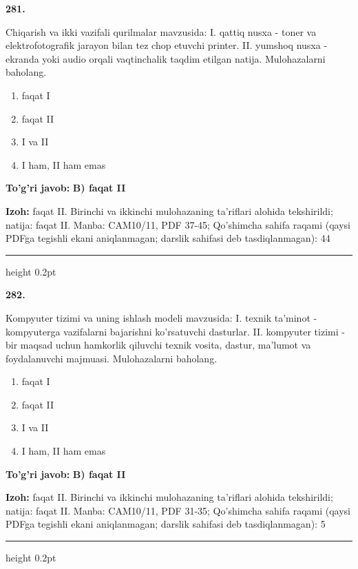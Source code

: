 \documentclass[10pt,a4paper]{article}
\begin{document}
{\bfseries\sffamily\color{ink} 281.}
\par
Chiqarish va ikki vazifali qurilmalar mavzusida: I. qattiq nusxa - toner va elektrofotografik jarayon bilan tez chop etuvchi printer. II. yumshoq nusxa - ekranda yoki audio orqali vaqtinchalik taqdim etilgan natija. Mulohazalarni baholang.
\begin{enumerate}[label=\Alph*),leftmargin=9mm]
\item faqat I
\item faqat II
\item I va II
\item I ham, II ham emas
\end{enumerate}
\begin{tcolorbox}[enhanced,breakable,colback=teal!4,colframe=teal!60!black,boxrule=0.45pt,arc=1.2mm,left=2.7mm,right=2.7mm,top=1.8mm,bottom=1.8mm,before skip=2mm,after skip=2mm]
{\bfseries\sffamily\color{teal}To'g'ri javob:} \textbf{B) faqat II}
\par\smallskip
{\bfseries Izoh:} faqat II. Birinchi va ikkinchi mulohazaning ta'riflari alohida tekshirildi; natija: faqat II. Manba: CAM10/11, PDF 37-45; Qo'shimcha sahifa raqami (qaysi PDFga tegishli ekani aniqlanmagan; darslik sahifasi deb tasdiqlanmagan): 44
\end{tcolorbox}
\vspace{2mm}\hrule height 0.2pt\vspace{3mm}

{\bfseries\sffamily\color{ink} 282.}
\par
Kompyuter tizimi va uning ishlash modeli mavzusida: I. texnik ta'minot - kompyuterga vazifalarni bajarishni ko'rsatuvchi dasturlar. II. kompyuter tizimi - bir maqsad uchun hamkorlik qiluvchi texnik vosita, dastur, ma'lumot va foydalanuvchi majmuasi. Mulohazalarni baholang.
\begin{enumerate}[label=\Alph*),leftmargin=9mm]
\item faqat I
\item faqat II
\item I va II
\item I ham, II ham emas
\end{enumerate}
\begin{tcolorbox}[enhanced,breakable,colback=teal!4,colframe=teal!60!black,boxrule=0.45pt,arc=1.2mm,left=2.7mm,right=2.7mm,top=1.8mm,bottom=1.8mm,before skip=2mm,after skip=2mm]
{\bfseries\sffamily\color{teal}To'g'ri javob:} \textbf{B) faqat II}
\par\smallskip
{\bfseries Izoh:} faqat II. Birinchi va ikkinchi mulohazaning ta'riflari alohida tekshirildi; natija: faqat II. Manba: CAM10/11, PDF 31-35; Qo'shimcha sahifa raqami (qaysi PDFga tegishli ekani aniqlanmagan; darslik sahifasi deb tasdiqlanmagan): 5
\end{tcolorbox}
\vspace{2mm}\hrule height 0.2pt\vspace{3mm}
\end{document}
